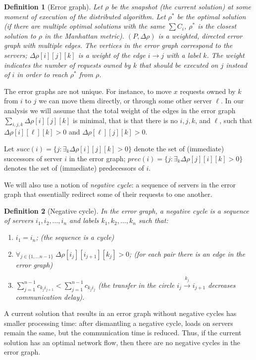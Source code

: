 \documentclass[11pt]{article}
\newtheorem{definition}{Definition}
\begin{document}
\begin{definition}[Error graph]
Let $\rho$ be the snapshot (the current solution) at some moment of execution of the distributed algorithm. 
Let $\rho^{*}$ be the optimal solution (if there are multiple optimal solutions with the same $\sum{C_i}$, $\rho^{*}$ is the closest solution to $\rho$ in the Manhattan metric).
$(P, \Delta \rho)$ is a weighted, directed \emph{error graph} with multiple edges. The vertices in the error graph correspond to the servers; $\Delta \rho[i][j][k]$ is a weight of the edge $i \rightarrow j$ with a label $k$. The weight indicates the number of requests owned by $k$ that should be executed on $j$ instead of $i$ in order to reach $\rho^{*}$ from $\rho$.
\end{definition}

The error graphs are not unique. For instance, to move $x$ requests owned by $k$ from $i$ to $j$ we can move them directly, or through some other server $\ell$. In our analysis we will assume that the total weight of the edges in the error graph $\sum_{i, j, k}\Delta \rho[i][j][k]$ is minimal, that is that there is no $i, j, k$, and $\ell$, such that $\Delta \rho[i][\ell][k] > 0$ and $\Delta \rho[\ell][j][k] > 0$.

Let $succ(i) = \{j: \exists_k \Delta \rho[i][j][k] > 0\}$ denote the set of (immediate) successors of server $i$ in the error graph; $prec(i)= \{j: \exists_k \Delta \rho[j][i][k] > 0\}$ denotes the set of (immediate) predecessors of $i$.

We will also use a notion of \emph{negative cycle}: a sequence of servers in the error graph that essentially redirect some of their requests to one another.
\begin{definition}[Negative cycle]
In the error graph, a \emph{negative cycle} is a sequence of servers $i_{1}, i_{2}, \ldots, i_{n}$ and labels $k_{1}, k_{2}, \ldots, k_{n}$ such that:
\begin{enumerate}
\item $i_{1} = i_{n}$; (the sequence is a cycle)
\item $\forall_{j \in \{1,\ldots n-1\}}\; \Delta \rho[i_{j}][i_{j+1}][k_j] > 0$; (for each pair there is an edge in the error graph)
\item $\sum_{j=1}^{n-1} c_{k_{j}i_{j+1}} < \sum_{j=1}^{n-1} c_{k_{j}i_{j}}$ (the transfer in the circle $i_{j} \xrightarrow{k_j} i_{j+1}$ decreases communication delay).
\end{enumerate}
\end{definition}
A current solution that results in an error graph without negative cycles has smaller processing time: after dismantling a negative cycle, loads on servers remain the same, but the communication time is reduced. Thus, if the current solution has an optimal network flow, then there are no negative cycles in the error graph. 
\end{document}
